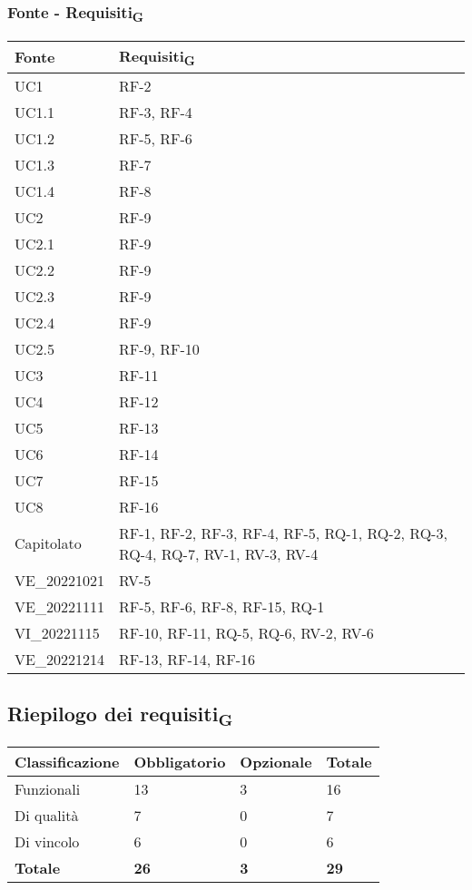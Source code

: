 \subsubsection{Fonte - Requisiti\textsubscript{G}}
\begin{table}[H]
	\centering
	\begin{tabular}{| p{} | p{} |} 
 \hline
 \textbf{Fonte} & \textbf{Requisiti\textsubscript{G}} \\
 \hline
	UC1 & RF-2\\
\hline
	UC1.1 & RF-3, RF-4\\
\hline
	UC1.2 & RF-5, RF-6\\
\hline
	UC1.3 & RF-7\\
\hline
	UC1.4 & RF-8\\
\hline
	UC2 & RF-9\\
 \hline
	UC2.1 & RF-9\\
 \hline
	UC2.2 & RF-9\\
  \hline
	UC2.3 & RF-9\\
  \hline
	UC2.4 & RF-9\\
  \hline
	UC2.5 & RF-9, RF-10\\
\hline
	UC3 & RF-11\\ 
\hline
	UC4 & RF-12\\
 \hline
	UC5 & RF-13\\
 \hline
	UC6 & RF-14\\
 \hline
	UC7 & RF-15\\
 \hline
	UC8 & RF-16\\
\hline
	Capitolato & RF-1, RF-2, RF-3, RF-4, RF-5, RQ-1, RQ-2, RQ-3, RQ-4, RQ-7, RV-1, RV-3, RV-4\\
 \hline
	VE\_20221021 & RV-5\\
\hline
	VE\_20221111 & RF-5, RF-6, RF-8, RF-15, RQ-1\\
\hline
	VI\_20221115 & RF-10, RF-11, RQ-5, RQ-6, RV-2, RV-6\\
 \hline
	VE\_20221214 & RF-13, RF-14, RF-16\\
\hline
	\end{tabular}
\end{table}

\subsection{Riepilogo dei requisiti\textsubscript{G}}

\begin{table}[h]
	\centering
	\begin{tabular}{| p{} | p{} | p{} | p{} |} 
		\hline
		\textbf{Classificazione} & \textbf{Obbligatorio} & \textbf{Opzionale} & \textbf{Totale} \\
		\hline
		Funzionali & 13 & 3 & 16\\
		\hline
		Di qualità & 7 & 0 & 7\\
		\hline
		Di vincolo & 6 & 0 & 6\\
		\hline
		\textbf{Totale} & \textbf{26} &\textbf {3} &  \textbf{29}\\
		\hline
	\end{tabular}
\end{table}
